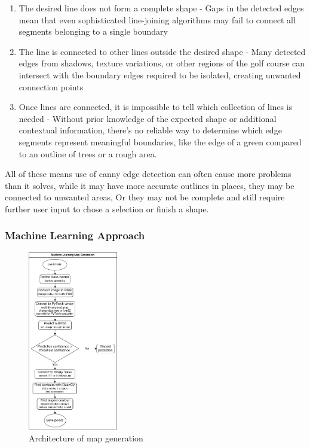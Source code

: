 \documentclass[final]{cmpreport_02}
\begin{document}
\begin{enumerate}
	\item The desired line does not form a complete shape - Gaps in the detected edges mean that even sophisticated line-joining algorithms may fail to connect all segments belonging to a single boundary

	\item The line is connected to other lines outside the desired shape - Many detected edges from shadows, texture variations, or other regions of the golf course can intersect with the boundary edges required to be isolated, creating unwanted connection points

	\item Once lines are connected, it is impossible to tell which collection of lines is needed - Without prior knowledge of the expected shape or additional contextual information, there's no reliable way to determine which edge segments represent meaningful boundaries, like the edge of a green compared to an outline of trees or a rough area.
\end{enumerate}
All of these means use of canny edge detection can often cause more problems than it solves, while it may have more accurate outlines in places, they may be connected to unwanted areas, Or they may not be complete and still require further user input to chose a selection or finish a shape.

\subsubsection{Machine Learning Approach}

\begin{figure}[H]
	\centering
	\includegraphics[width=0.35\textwidth]{./images/MLAE.drawio.png}
	\caption{Architecture of map generation}
	\label{AE:MLAE}
\end{figure}
\end{document}

